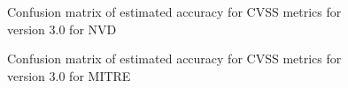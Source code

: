 \documentclass[12pt]{article}
\begin{document}
\begin{figure}[H]
	\centering
	\caption{\label{fig:nvd_30_confusion_matrices}Confusion matrix of estimated accuracy for CVSS metrics for version 3.0 for NVD}
\end{figure}

\begin{figure}[H]
	\centering
	\caption{\label{fig:mitre_30_confusion_matrices}Confusion matrix of estimated accuracy for CVSS
		metrics for version 3.0 for MITRE}
\end{figure}
\end{document}
